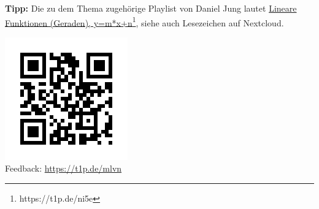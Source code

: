 \documentclass[a4paper,ngerman,12pt]{exams}
\begin{document}

\par \textbf{Tipp:} Die zu dem Thema zugehörige Playlist von Daniel Jung lautet \href{https://t1p.de/ni5e}{Lineare Funktionen (Geraden), y=m*x+n\footnote{\url{https://t1p.de/ni5e}}}, siehe auch Lesezeichen auf Nextcloud.

\includegraphics[scale=0.4]{qr-code-t1p-de-mlvn.png}\\
Feedback: \href{https://t1p.de/mlvn}{https://t1p.de/mlvn}

%
\end{document}
